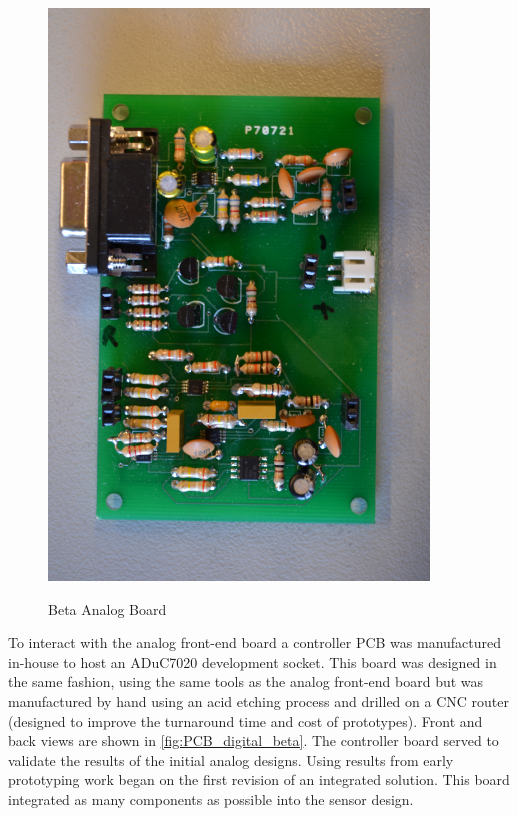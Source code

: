 \begin{figure}
	\begin{center}
		\label{fig:PCB_analog_beta}
		\includegraphics[scale=1,width=0.9\textwidth]{Images/PCB_AnalogBeta.JPG} 
		\caption{Beta Analog Board}
	\end{center}
\end{figure}

To interact with the analog front-end board a controller PCB was manufactured in-house to host an ADuC7020 development socket. This board was designed in the same fashion, using the same tools as the analog front-end board but was manufactured by hand using an acid etching process and drilled on a CNC router (designed to improve the turnaround time and cost of prototypes). Front and back views are shown in \cref{fig:PCB_digital_beta}. The controller board served to validate the results of the initial analog designs. Using results from early prototyping work began on the first revision of an integrated solution. This board integrated as many components as possible into the sensor design.

